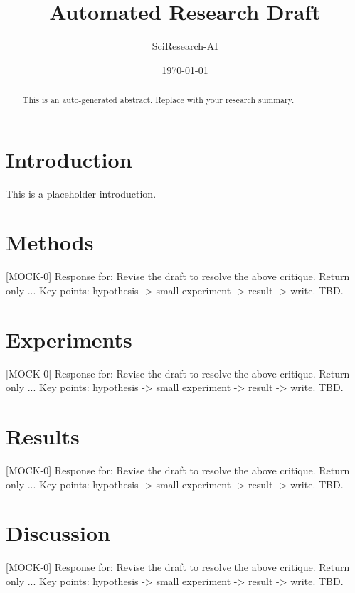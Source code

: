 \documentclass{article}
\title{Automated Research Draft}
\author{SciResearch-AI}
\date{\today}
\begin{document}
\maketitle

\begin{abstract}
This is an auto-generated abstract. Replace with your research summary.
\end{abstract}

\section{Introduction}
This is a placeholder introduction.

\section{Methods}
[MOCK-0] Response for: Revise the draft to resolve the above critique. Return only ...
Key points: hypothesis -> small experiment -> result -> write.
TBD.

\section{Experiments}
[MOCK-0] Response for: Revise the draft to resolve the above critique. Return only ...
Key points: hypothesis -> small experiment -> result -> write.
TBD.

\section{Results}
[MOCK-0] Response for: Revise the draft to resolve the above critique. Return only ...
Key points: hypothesis -> small experiment -> result -> write.
TBD.

\section{Discussion}
[MOCK-0] Response for: Revise the draft to resolve the above critique. Return only ...
Key points: hypothesis -> small experiment -> result -> write.
TBD.



\end{document}
